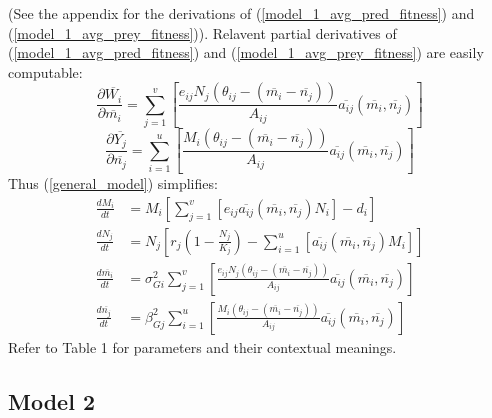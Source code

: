 \documentclass{amsart}
\theoremstyle{definition}
\theoremstyle{remark}
\numberwithin{equation}{section}
\begin{document}
(See the appendix for the derivations of (\ref{model_1_avg_pred_fitness}) and (\ref{model_1_avg_prey_fitness})).  Relavent partial derivatives of (\ref{model_1_avg_pred_fitness}) and (\ref{model_1_avg_prey_fitness}) are easily computable:
\begin{equation}
	\label{model_1_pred_fitness_partial}
	\frac{\partial \overline{W_i}}{\partial \overline{m_i}} = \sum\limits_{j = 1}^{v}\left[\frac{e_{ij}N_j(\theta_{ij} - (\overline{m_i} - \overline{n_j}))}{A_{ij}}\overline{a_{ij}}(\overline{m_i}, \overline{n_j})\right]
\end{equation}
\begin{equation}
	\label{model_1_prey_fitness_partial}
	\frac{\partial \overline{Y_j}}{\partial \overline{n_j}} = \sum\limits_{i = 1}^{u}\left[\frac{M_i(\theta_{ij} - (\overline{m_i} - \overline{n_j}))}{A_{ij}}\overline{a_{ij}}(\overline{m_i}, \overline{n_j})\right]
\end{equation}
Thus (\ref{general_model}) simplifies:
\begin{subequations}
	\label{model1}
	\begin{align}
		\label{eq:model1_a}
		\frac{dM_i}{dt} &= M_i\left[\sum\limits_{j = 1}^{v}\left[e_{ij}\overline{a_{ij}}(\overline{m_i}, \overline{n_j})N_i\right] - d_i\right] \\[5px]
		\label{eq:model1_b}
		\frac{dN_j}{dt} &= N_j\left[r_j\left(1 - \frac{N_j}{K_j}\right) - \sum\limits_{i = 1}^{u}\left[\overline{a_{ij}}(\overline{m_i}, \overline{n_j})M_i\right]\right] \\[5px]
		\label{eq:model1_c}
		\frac{d\overline{m_i}}{dt} &= \sigma_{Gi}^2\sum\limits_{j = 1}^{v}\left[\frac{e_{ij}N_j(\theta_{ij} - (\overline{m_i} - \overline{n_j}))}{A_{ij}}\overline{a_{ij}}(\overline{m_i}, \overline{n_j})\right] \\[5px]
		\label{eq:model1_d}
		\frac{d\overline{n_j}}{dt} &= \beta_{Gj}^2\sum\limits_{i = 1}^{u}\left[\frac{M_i(\theta_{ij} - (\overline{m_i} - \overline{n_j}))}{A_{ij}}\overline{a_{ij}}(\overline{m_i}, \overline{n_j})\right]
	\end{align}
\end{subequations}
Refer to Table 1 for parameters and their contextual meanings.















\subsection{Model 2}
\end{document}
